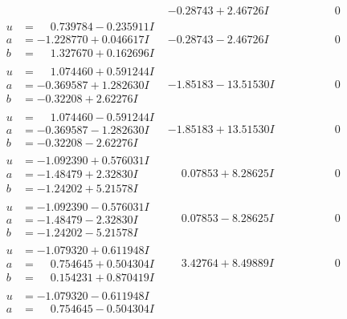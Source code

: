 \documentclass[1p]{elsarticle_modified}
\theoremstyle{definition}
\begin{document}
$$\begin{array}{c|c|c}
 & -0.28743 + 2.46726 I & \phantom{-0.000000 } 0 \\ \hline\begin{aligned}
u &= \phantom{-}0.739784 - 0.235911 I \\
a &= -1.228770 + 0.046617 I \\
b &= \phantom{-}1.327670 + 0.162696 I\end{aligned}
 & -0.28743 - 2.46726 I & \phantom{-0.000000 } 0 \\ \hline\begin{aligned}
u &= \phantom{-}1.074460 + 0.591244 I \\
a &= -0.369587 + 1.282630 I \\
b &= -0.32208 + 2.62276 I\end{aligned}
 & -1.85183 - 13.51530 I & \phantom{-0.000000 } 0 \\ \hline\begin{aligned}
u &= \phantom{-}1.074460 - 0.591244 I \\
a &= -0.369587 - 1.282630 I \\
b &= -0.32208 - 2.62276 I\end{aligned}
 & -1.85183 + 13.51530 I & \phantom{-0.000000 } 0 \\ \hline\begin{aligned}
u &= -1.092390 + 0.576031 I \\
a &= -1.48479 + 2.32830 I \\
b &= -1.24202 + 5.21578 I\end{aligned}
 & \phantom{-}0.07853 + 8.28625 I & \phantom{-0.000000 } 0 \\ \hline\begin{aligned}
u &= -1.092390 - 0.576031 I \\
a &= -1.48479 - 2.32830 I \\
b &= -1.24202 - 5.21578 I\end{aligned}
 & \phantom{-}0.07853 - 8.28625 I & \phantom{-0.000000 } 0 \\ \hline\begin{aligned}
u &= -1.079320 + 0.611948 I \\
a &= \phantom{-}0.754645 + 0.504304 I \\
b &= \phantom{-}0.154231 + 0.870419 I\end{aligned}
 & \phantom{-}3.42764 + 8.49889 I & \phantom{-0.000000 } 0 \\ \hline\begin{aligned}
u &= -1.079320 - 0.611948 I \\
a &= \phantom{-}0.754645 - 0.504304 I \\

\end{aligned}
\end{array}$$
\end{document}

